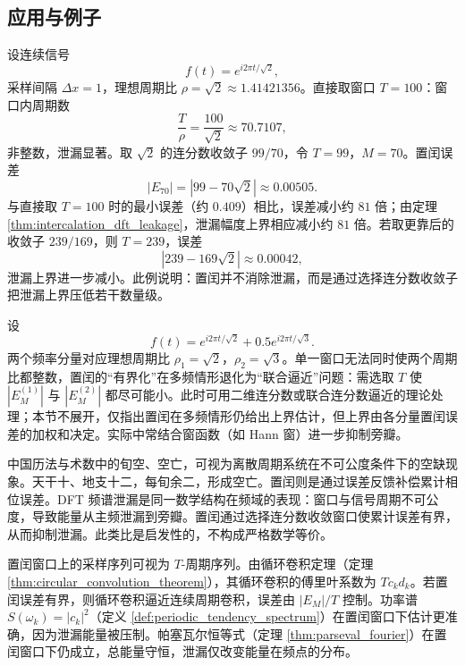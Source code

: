 \subsection{应用与例子}

\begin{example}[单频信号的泄漏有界化]\label{ex:single_tone_leakage}
设连续信号
\[
f(t)=e^{i2\pi t/\sqrt{2}},
\]
采样间隔 $\Delta x=1$，理想周期比 $\rho=\sqrt{2}\approx 1.41421356$。直接取窗口 $T=100$：窗口内周期数
\[
\frac{T}{\rho}=\frac{100}{\sqrt{2}}\approx 70.7107,
\]
非整数，泄漏显著。取 $\sqrt{2}$ 的连分数收敛子 $99/70$，令 $T=99$，$M=70$。置闰误差
\[
|E_{70}|=|99-70\sqrt{2}|\approx 0.00505.
\]
与直接取 $T=100$ 时的最小误差（约 $0.409$）相比，误差减小约 $81$ 倍；由定理 \ref{thm:intercalation_dft_leakage}，泄漏幅度上界相应减小约 $81$ 倍。若取更靠后的收敛子 $239/169$，则 $T=239$，误差
\[
|239-169\sqrt{2}|\approx 0.00042,
\]
泄漏上界进一步减小。此例说明：置闰并不消除泄漏，而是通过选择连分数收敛子把泄漏上界压低若干数量级。
\end{example}

\begin{example}[多频信号与联合逼近]\label{ex:multi_tone_intercalation}
设
\[
f(t)=e^{i2\pi t/\sqrt{2}}+0.5e^{i2\pi t/\sqrt{3}}.
\]
两个频率分量对应理想周期比 $\rho_1=\sqrt{2}$，$\rho_2=\sqrt{3}$。单一窗口无法同时使两个周期比都整数，置闰的“有界化”在多频情形退化为“联合逼近”问题：需选取 $T$ 使 $|E_M^{(1)}|$ 与 $|E_M^{(2)}|$ 都尽可能小。此时可用二维连分数或联合连分数逼近的理论处理；本节不展开，仅指出置闰在多频情形仍给出上界估计，但上界由各分量置闰误差的加权和决定。实际中常结合窗函数（如 Hann 窗）进一步抑制旁瓣。
\end{example}

\begin{remark}[旬空、空亡与频谱泄漏的类比]\label{rem:xunkong_leakage_analogy}
中国历法与术数中的旬空、空亡，可视为离散周期系统在不可公度条件下的空缺现象。天干十、地支十二，每旬余二，形成空亡。置闰则是通过误差反馈补偿累计相位误差。DFT 频谱泄漏是同一数学结构在频域的表现：窗口与信号周期不可公度，导致能量从主频泄漏到旁瓣。置闰通过选择连分数收敛窗口使累计误差有界，从而抑制泄漏。此类比是启发性的，不构成严格数学等价。
\end{remark}

\begin{remark}[与循环卷积和功率谱的接口]\label{rem:intercalation_convolution_spectrum}
置闰窗口上的采样序列可视为 \(T\)-周期序列。由循环卷积定理（定理 \ref{thm:circular_convolution_theorem}），其循环卷积的傅里叶系数为 \(Tc_kd_k\)。若置闰误差有界，则循环卷积逼近连续周期卷积，误差由 \(|E_M|/T\) 控制。功率谱 \(S(\omega_k)=|c_k|^2\)（定义 \ref{def:periodic_tendency_spectrum}）在置闰窗口下估计更准确，因为泄漏能量被压制。帕塞瓦尔恒等式（定理 \ref{thm:parseval_fourier}）在置闰窗口下仍成立，总能量守恒，泄漏仅改变能量在频点的分布。
\end{remark}


